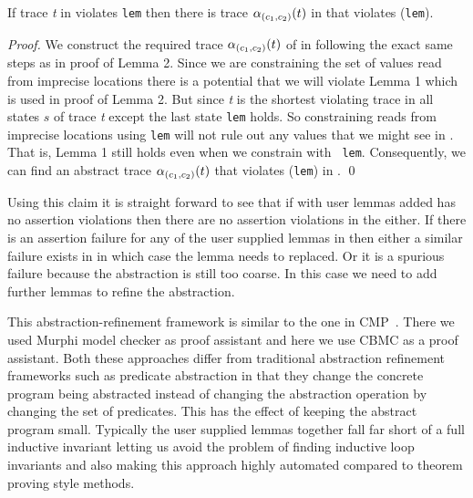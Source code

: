 \begin{lemma}

  If trace \emph{t} in \prog{} violates {\tt lem} then there is trace
  \(\alpha_{(c_1,c_2)}(t)\) in \progabst{} that violates \trrd({\tt lem}).
  
\end{lemma}

\begin{proof}

 We construct the required trace \(\alpha_{(c_1,c_2)}(t)\) of in \progabst{}
 following the exact same steps as in proof of Lemma 2. Since we are
 constraining the set of values read from imprecise locations there is
 a potential that we will violate Lemma 1 which is used in proof of
 Lemma 2. But since \emph{t} is the shortest violating trace in all
 states \(s\) of trace \emph{t} except the last state {\tt lem}
 holds. So constraining reads from imprecise locations using {\tt lem}
 will not rule out any values that we might see in \prog. That is,
 Lemma 1 still holds even when we constrain \progabst{} with {\tt
   lem}. Consequently, we can find an abstract trace \(\alpha_{(c_1,c_2)}(t)\) that
 violates \trrd({\tt lem}) in \progabst. \qed
  
\end{proof}

Using this claim it is straight forward to see that if \progabst{}
with user lemmas added has no assertion violations then there are no
assertion violations in the \prog either. If there is an assertion
failure for any of the user supplied lemmas in \progabst{} then either
a similar failure exists in \prog{} in which case the lemma needs to
replaced. Or it is a spurious failure because the abstraction is still
too coarse. In this case we need to add further lemmas to refine the
abstraction.

This abstraction-refinement framework is similar to the one in
CMP~\cite{self}. There we used Murphi model checker as proof assistant
and here we use CBMC as a proof assistant. Both these approaches
differ from traditional abstraction refinement frameworks such as
predicate abstraction in that they change the concrete program being
abstracted instead of changing the abstraction operation by changing
the set of predicates. This has the effect of keeping the abstract
program small. Typically the user supplied lemmas together fall far
short of a full inductive invariant letting us avoid the problem of
finding inductive loop invariants and also making this approach highly
automated compared to theorem proving style methods.

